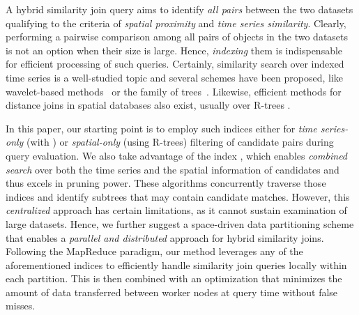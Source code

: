 
A hybrid similarity join query aims to identify {\em all pairs} between the two datasets qualifying to the criteria of {\em spatial proximity} and {\em time series similarity}. Clearly, performing a pairwise comparison among all pairs of objects in the two datasets is not an option when their size is large. Hence, {\em indexing} them is indispensable for efficient processing of such queries. Certainly, similarity search over indexed time series is a well-studied topic and several schemes have been proposed, like wavelet-based methods~\cite{chan1999icde} or the family of \isax trees~\cite{shieh2008kdd,camerra2010icdm,camerra2014kais,zoumpatianos2014sigmod}. Likewise, efficient methods for distance joins in spatial databases also exist, usually over R-trees \cite{DBLP:conf/sigmod/BrinkhoffKS93, papadias1999processing}. 

In this paper, our starting point is to employ such indices either for {\em time series-only} (with \isax) or {\em spatial-only} (using R-trees) filtering of candidate pairs during query evaluation. We also take advantage of the \btsr index \cite{chatzig17btsr}, which enables {\em combined search} over both the time series and the spatial information of candidates and thus excels in pruning power. These algorithms concurrently traverse those indices and identify subtrees that may contain candidate matches. However, this {\em centralized} approach has certain limitations, as it cannot sustain examination of large datasets. Hence, we further suggest a space-driven data partitioning scheme that enables a {\em parallel and distributed} approach for hybrid similarity joins. Following the MapReduce paradigm, our method leverages any of the aforementioned indices to efficiently handle similarity join queries locally within each partition. This is then combined with an optimization that minimizes the amount of data transferred between worker nodes at query time without false misses.


